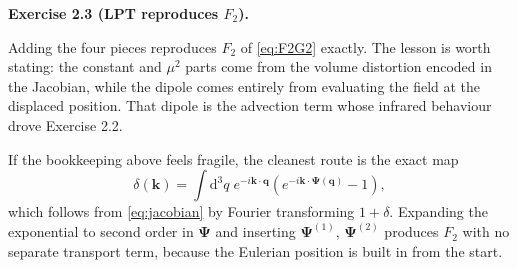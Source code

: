\documentclass[a4paper,11pt]{article}
\newcommand{\vq}{\bm{q}}
\newcommand{\vk}{\bm{k}}
\newcommand{\vPsi}{\bm{\Psi}}
\newcommand{\dd}{\mathrm{d}}
\newenvironment{solution}[1]
  {\par\medskip\noindent\textbf{#1}\par\nobreak\smallskip}
  {\par\medskip}
\begin{document}
\begin{solution}{Exercise 2.3 (LPT reproduces $F_2$).}
Adding the four pieces reproduces $F_2$ of \eqref{eq:F2G2} exactly. The lesson
is worth stating: the constant and $\mu^2$ parts come from the volume
distortion encoded in the Jacobian, while the dipole comes entirely from
evaluating the field at the displaced position. That dipole is the advection
term whose infrared behaviour drove Exercise 2.2.

If the bookkeeping above feels fragile, the cleanest route is the exact map
\begin{equation*}
\delta(\vk) = \int\!\dd^3q\; e^{-i\vk\cdot\vq}
\left(e^{-i\vk\cdot\vPsi(\vq)}-1\right),
\end{equation*}
which follows from \eqref{eq:jacobian} by Fourier transforming
$1+\delta$. Expanding the exponential to second order in $\vPsi$ and inserting
$\vPsi^{(1)}$, $\vPsi^{(2)}$ produces $F_2$ with no separate transport term,
because the Eulerian position is built in from the start.
\end{solution}
\end{document}

